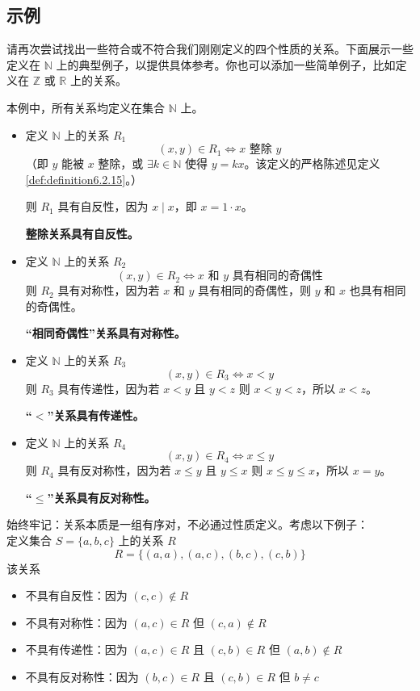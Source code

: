 
\subsection{示例}

请再次尝试找出一些符合或不符合我们刚刚定义的四个性质的关系。下面展示一些定义在 $\mathbb{N}$ 上的典型例子，以提供具体参考。你也可以添加一些简单例子，比如定义在 $\mathbb{Z}$ 或 $\mathbb{R}$ 上的关系。

\begin{example}
    本例中，所有关系均定义在集合 $\mathbb{N}$ 上。
    \begin{itemize}
        \item 定义 $\mathbb{N}$ 上的关系 $R_1$
        \[(x, y) \in R_1 \iff x \text{\ 整除\ } y\]
        （即 $y$ 能被 $x$ 整除，或 $\exists k \in \mathbb{N}$ 使得 $y=kx$。该定义的严格陈述见定义 \ref{def:definition6.2.15}。）

        则 $R_1$ 具有自反性，因为 $x \mid x$，即 $x=1 \cdot x$。

        \textbf{整除关系具有自反性。}
        \item 定义 $\mathbb{N}$ 上的关系 $R_2$
        \[(x, y) \in R_2 \iff x \text{\ 和\ } y \text{\ 具有相同的奇偶性}\]
        则 $R_2$ 具有对称性，因为若 $x$ 和 $y$ 具有相同的奇偶性，则 $y$ 和 $x$ 也具有相同的奇偶性。

        \textbf{``相同奇偶性''关系具有对称性。}
        \item 定义 $\mathbb{N}$ 上的关系 $R_3$
        \[(x, y) \in R_3 \iff x < y\]
        则 $R_3$ 具有传递性，因为若 $x<y$ 且 $y<z$ 则 $x<y<z$，所以 $x<z$。

        \textbf{``$<$''关系具有传递性。}
        \item 定义 $\mathbb{N}$ 上的关系 $R_4$
        \[(x, y) \in R_4 \iff x \le y\]
        则 $R_4$ 具有反对称性，因为若 $x \le y$ 且 $y \le x$ 则 $x \le y \le x$，所以 $x=y$。

        \textbf{``$\le$''关系具有反对称性。}
    \end{itemize}
\end{example}

\begin{example}
    始终牢记：关系本质是一组有序对，不必通过性质定义。考虑以下例子：\\
    定义集合 $S=\{a,b,c\}$ 上的关系 $R$
    \[R = \{(a, a),(a, c),(b, c),(c, b)\}\]
    该关系
    \begin{itemize}
        \item 不具有自反性：\quad 因为 $(c,c) \notin R$
        \item 不具有对称性：\quad 因为 $(a, c) \in R$ 但 $(c, a) \notin R$
        \item 不具有传递性：\quad 因为 $(a, c) \in R$ 且 $(c, b) \in R$ 但 $(a, b) \notin R$
        \item 不具有反对称性：因为 $(b, c) \in R$ 且 $(c, b) \in R$ 但 $b \ne c$
    \end{itemize}
\end{example}

